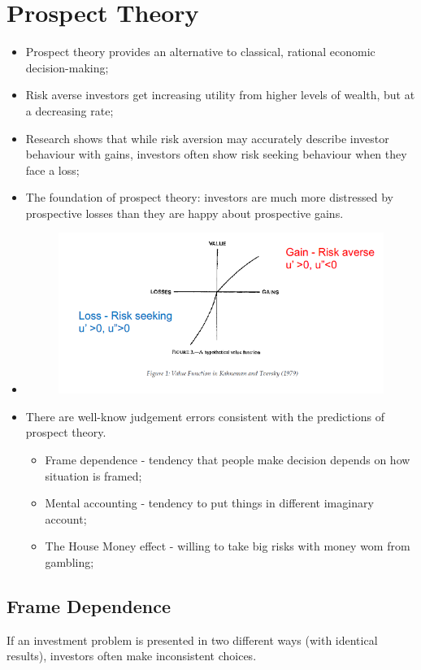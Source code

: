 \documentclass[11pt,a4paper]{report}
\begin{document}
\section{Prospect Theory}
\begin{itemize}
    \item Prospect theory provides an alternative to classical, rational economic decision-making;
    \item Risk averse investors get increasing utility from higher levels of wealth, but at a decreasing rate;
    \item Research shows that while risk aversion may accurately describe investor behaviour with gains, investors often show risk seeking behaviour when they face a loss;
    \item The foundation of prospect theory: investors are much more distressed by prospective losses than they are happy about prospective gains.
    \item \begin{figure}[h]
        \centering
        \includegraphics[width=\textwidth]{images/prospect theroy.png}
    \end{figure}
    \item There are well-know judgement errors consistent with the predictions of prospect theory.
    \begin{itemize}
        \item Frame dependence - tendency that people make decision depends on how situation is framed;
        \item Mental accounting - tendency to put things in different imaginary account;
        \item The House Money effect - willing to take big risks with money wom from gambling;
    \end{itemize}
\end{itemize}
    \subsection{Frame Dependence}
    If an investment problem is presented in two different ways (with identical results), investors often make inconsistent choices.
\end{document}
